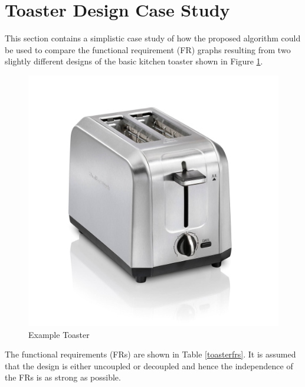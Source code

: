\section{Toaster Design Case Study}

This section contains a simplistic case study of how the proposed algorithm could be used to compare the functional
requirement (FR) graphs resulting from two slightly different designs of the basic kitchen toaster shown in
Figure \ref{fig:toaster}.

\begin{figure}[h]
  \label{fig:toaster}
  \begin{center}
    \includegraphics[scale=0.2]{toaster}
  \end{center}
  \caption{Example Toaster}
\end{figure}

The functional requirements (FRs) are shown in Table \ref{toasterfrs}.  It is assumed that the design is either
uncoupled or decoupled and hence the independence of the FRs is as strong as possible.

